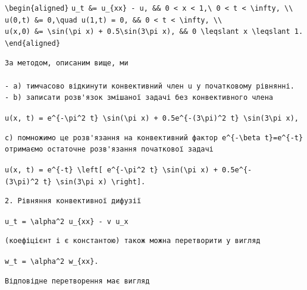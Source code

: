 \documentclass[
  ukrainian,
]{article}
\begin{document}
\texttt{\textbackslash{}begin\{aligned\}}
\texttt{u\_t\ \&=\ u\_\{xx\}\ -\ u,\ \&\&\ 0\ \textless{}\ x\ \textless{}\ 1,\textbackslash{}\ 0\ \textless{}\ t\ \textless{}\ \textbackslash{}infty,\ \textbackslash{}\textbackslash{}}
\texttt{u(0,t)\ \&=\ 0,\textbackslash{}quad\ u(1,t)\ =\ 0,\ \&\&\ 0\ \textless{}\ t\ \textless{}\ \textbackslash{}infty,\ \textbackslash{}\textbackslash{}}
\texttt{u(x,0)\ \&=\ \textbackslash{}sin(\textbackslash{}pi\ x)\ +\ 0.5\textbackslash{}sin(3\textbackslash{}pi\ x),\ \&\&\ 0\ \textbackslash{}leqslant\ x\ \textbackslash{}leqslant\ 1.}
\texttt{\textbackslash{}end\{aligned\}}

\begin{verbatim}
За методом, описаним вище, ми

- a) тимчасово відкинути конвективний член u у початковому рівнянні.
- b) записати розв'язок змішаної задачі без конвективного члена
\end{verbatim}

\texttt{u(x,\ t)\ =\ e\^{}\{-\textbackslash{}pi\^{}2\ t\}\ \textbackslash{}sin(\textbackslash{}pi\ x)\ +\ 0.5e\^{}\{-(3\textbackslash{}pi)\^{}2\ t\}\ \textbackslash{}sin(3\textbackslash{}pi\ x),}

\begin{verbatim}
c) помножимо це розв'язання на конвективний фактор e^{-\beta t}=e^{-t} отримаємо остаточне розв'язання початкової задачі
\end{verbatim}

\texttt{u(x,\ t)\ =\ e\^{}\{-t\}\ \textbackslash{}left{[}\ e\^{}\{-\textbackslash{}pi\^{}2\ t\}\ \textbackslash{}sin(\textbackslash{}pi\ x)\ +\ 0.5e\^{}\{-(3\textbackslash{}pi)\^{}2\ t\}\ \textbackslash{}sin(3\textbackslash{}pi\ x)\ \textbackslash{}right{]}.}

\begin{verbatim}
2. Рівняння конвективної дифузії
\end{verbatim}

\texttt{u\_t\ =\ \textbackslash{}alpha\^{}2\ u\_\{xx\}\ -\ v\ u\_x}

\begin{verbatim}
(коефіцієнт і є константою) також можна перетворити у вигляд
\end{verbatim}

\texttt{w\_t\ =\ \textbackslash{}alpha\^{}2\ w\_\{xx\}.}

\begin{verbatim}
Відповідне перетворення має вигляд
\end{verbatim}
\end{document}
